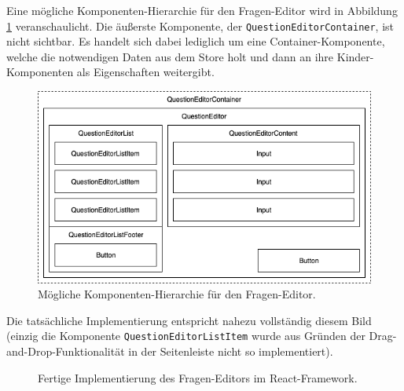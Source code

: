 Eine mögliche Komponenten-Hierarchie für den Fragen-Editor wird in Abbildung \ref{abb:komponenten_hierarchie} veranschaulicht. Die äußerste Komponente, der \texttt{QuestionEditorContainer}, ist nicht sichtbar. Es handelt sich dabei lediglich um eine Container-Komponente, welche die notwendigen Daten aus dem Store holt und dann an ihre Kinder-Komponenten als Eigenschaften weitergibt.

\begin{figure}[H]
    \includegraphics[width=\textwidth]{chapter/entwurf/bilder/Component_Hierarchy.png}
    \centering
    \caption[Komponenten-Hierarchie des Fragen-Editors]{Mögliche Komponenten-Hierarchie für den Fragen-Editor.}
    \label{abb:komponenten_hierarchie}
\end{figure}

Die tatsächliche Implementierung entspricht nahezu vollständig diesem Bild (einzig die Komponente \texttt{QuestionEditorListItem} wurde aus Gründen der Drag-and-Drop-Funktionalität in der Seitenleiste nicht so implementiert).


\begin{figure}[H]
    \centering
    \setlength{\fboxsep}{0pt}
    \setlength{\fboxrule}{0.5pt}
    \caption[Fertigegestellter Fragen-Editor in Weclare]{Fertige Implementierung des Fragen-Editors im React-Framework.}
    \label{abb:weclare_editor}
\end{figure}

